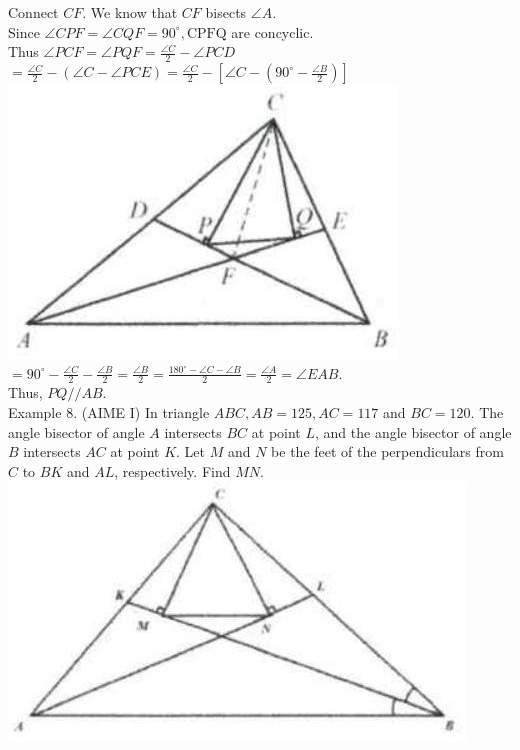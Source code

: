 \documentclass[10pt]{article}
\begin{document}
Connect \(C F\). We know that \(C F\) bisects \(\angle A\).\\
Since \(\angle C P F=\angle C Q F=90^{\circ}, \mathrm{CPFQ}\) are concyclic.\\
Thus \(\angle P C F=\angle P Q F=\frac{\angle C}{2}-\angle P C D\)\\
\(=\frac{\angle C}{2}-(\angle C-\angle P C E)=\frac{\angle C}{2}-\left[\angle C-\left(90^{\circ}-\frac{\angle B}{2}\right)\right]\)\\
\includegraphics[max width=\textwidth, center]{2025_04_17_97bc1f7e44d93c271a88g-059(1)}\\
\(=90^{\circ}-\frac{\angle C}{2}-\frac{\angle B}{2}=\frac{\angle B}{2}=\frac{180^{\circ}-\angle C-\angle B}{2}=\frac{\angle A}{2}=\angle E A B\).\\
Thus, \(P Q / / A B\).\\
Example 8. (AIME I) In triangle \(A B C, A B=125, A C=117\) and \(B C=120\). The angle bisector of angle \(A\) intersects \(B C\) at point \(L\), and the angle bisector of angle \(B\) intersects \(A C\) at point \(K\). Let \(M\) and \(N\) be the feet of the perpendiculars from \(C\) to \(B K\) and \(A L\), respectively. Find \(M N\).\\
\includegraphics[max width=\textwidth, center]{2025_04_17_97bc1f7e44d93c271a88g-059(2)}
\end{document}
